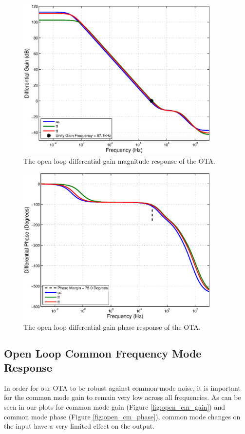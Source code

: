\documentclass[journal]{IEEEtran}
\begin{document}
\begin{figure}
\centering
\includegraphics[width=4in]{Plots/open_dm_gain.eps}
\caption{The open loop differential gain magnitude response of the OTA.}
\label{fig:open_dm_gain}
\end{figure}


\begin{figure}
\centering
\includegraphics[width=4in]{Plots/open_dm_phase.eps}
\caption{The open loop differential gain phase response of the OTA.}
\label{fig:open_dm_phase}
\end{figure}

\subsection{Open Loop Common Frequency Mode Response}
In order for our OTA to be robust against common-mode noise, it is important for the common mode gain to remain very low across all frequencies. As can be seen in our plots for common mode gain (Figure \ref{fig:open_cm_gain}) and common mode phase (Figure \ref{fig:open_cm_phase}), common mode changes on the input have a very limited effect on the output.
\end{document}
